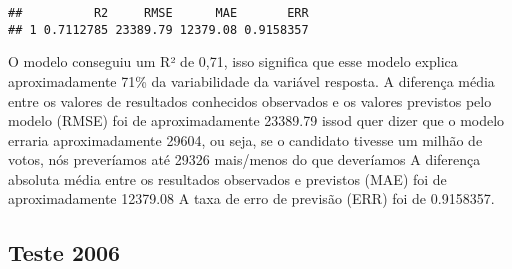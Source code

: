 \documentclass[]{article}
\newenvironment{Shaded}{\begin{snugshade}}{\end{snugshade}}
\newcommand{\KeywordTok}[1]{\textcolor[rgb]{0.13,0.29,0.53}{\textbf{#1}}}
\newcommand{\DataTypeTok}[1]{\textcolor[rgb]{0.13,0.29,0.53}{#1}}
\newcommand{\DecValTok}[1]{\textcolor[rgb]{0.00,0.00,0.81}{#1}}
\newcommand{\StringTok}[1]{\textcolor[rgb]{0.31,0.60,0.02}{#1}}
\newcommand{\OperatorTok}[1]{\textcolor[rgb]{0.81,0.36,0.00}{\textbf{#1}}}
\newcommand{\NormalTok}[1]{#1}
\begin{document}
\begin{Shaded}
\end{Shaded}

\begin{verbatim}
##          R2     RMSE      MAE       ERR
## 1 0.7112785 23389.79 12379.08 0.9158357
\end{verbatim}

O modelo conseguiu um R² de 0,71, isso significa que esse modelo explica
aproximadamente 71\% da variabilidade da variável resposta. A diferença
média entre os valores de resultados conhecidos observados e os valores
previstos pelo modelo (RMSE) foi de aproximadamente 23389.79 issod quer
dizer que o modelo erraria aproximadamente 29604, ou seja, se o
candidato tivesse um milhão de votos, nós preveríamos até 29326
mais/menos do que deveríamos A diferença absoluta média entre os
resultados observados e previstos (MAE) foi de aproximadamente 12379.08
A taxa de erro de previsão (ERR) foi de 0.9158357.

\subsection{Teste 2006}\label{teste-2006-1}
\end{document}
